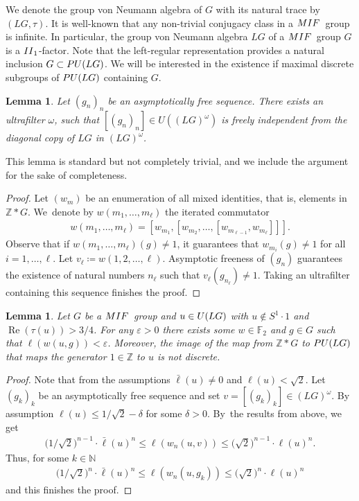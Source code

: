 \documentclass[11pt]{article}
\numberwithin{equation}{section}
\numberwithin{equation}{section}
\newtheorem{Lemma}[Theorem]{Lemma}
\begin{document}
We denote the group von Neumann algebra of $G$ with its natural trace by $(LG,\tau)$. It is well-known that any non-trivial conjugacy class in a ${\rm MIF}$~group is infinite. In particular, the group von Neumann algebra $LG$ of a ${\rm MIF}$~group $G$ is a ${\rm II}_1$-factor. Note that the left-regular representation provides a natural inclusion $G \subset {\rm PU}(LG)$.
 We will be interested in the existence if maximal discrete subgroups of ${\rm PU}(LG)$ containing $G$.

\begin{Lemma}
Let $(g_n)_n$ be an asymptotically free sequence. There exists an ultrafilter $\omega$, such that $[(g_n)_n] \in U((LG)^{\omega})$ is freely independent from the diagonal copy of $LG$ in $(LG)^\omega$.
\end{Lemma}
This lemma is standard but not completely trivial, and we include the argument for the sake of completeness.
\begin{proof}
Let $(w_m)$ be an enumeration of all mixed identities, that is, elements in $\mathbb Z\ast G$. We~denote by $w(m_1,\dots,m_\ell)$ the iterated commutator
\begin{gather*}
w(m_1,\dots,m_\ell) = [w_{m_1},[w_{m_2},\dots, [w_{m_{\ell-1}},w_{m_\ell}]]].
\end{gather*}
Observe that if $w(m_1,\dots,m_\ell)(g) \neq 1$, it guarantees that $w_{m_i}(g)\neq 1$ for all $i=1,\dots,\ell$. Let $v_\ell\coloneqq w(1,2,\dots,\ell)$. Asymptotic freeness of $(g_n)$ guarantees the existence of natural numbers $n_\ell$ such that $v_\ell(g_{n_\ell})\neq 1$. Taking an ultrafilter containing this sequence finishes the proof.
\end{proof}

\begin{Lemma}
Let $G$ be a ${\rm MIF}$~group and $u \in {\rm U}(LG)$ with $u \not \in S^1 \cdot 1$ and $\operatorname{Re}(\tau(u))>3/4$. For any $\varepsilon>0$ there exists some $w \in \mathbb F_2$ and $g \in G$ such that $\ell(w(u,g))< \varepsilon$. Moreover, the image of the map from $\mathbb Z \ast G$ to ${\rm PU}(LG)$ that maps the generator $1 \in \mathbb Z$ to $u$ is not discrete.
\end{Lemma}
\begin{proof}
Note that from the assumptions $\bar \ell(u) \neq 0$ and $\ell(u)< \sqrt{2}$.
Let $(g_k)_k$ be an asymptotically free sequence and set $v= [(g_k)_k] \in (LG)^{\omega}$. By assumption $\ell(u) \leq 1/\sqrt{2} - \delta$ for some $\delta>0$. By~the results from above, we get
\begin{gather*}
\big(1/\sqrt{2}\big)^{n-1} \cdot \bar\ell(u)^n \leq \ell(w_n(u,v)) \leq\big(\sqrt{2}\big)^{n-1} \cdot \ell(u)^n.
\end{gather*}
Thus, for some $k \in \mathbb N$
\begin{gather*}
\big(1/\sqrt{2}\big)^{n} \cdot \bar\ell(u)^n \leq \ell(w_n(u,g_k)) \leq \big(\sqrt{2}\big)^{n} \cdot \ell(u)^n
\end{gather*}
and this finishes the proof.
\end{proof}
\end{document}
